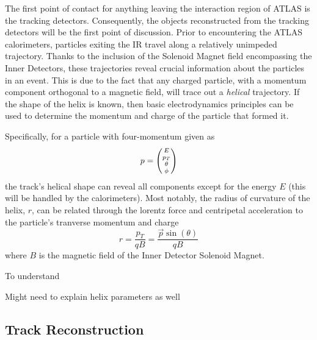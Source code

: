             The first point of contact for anything leaving the interaction region of ATLAS is the tracking detectors.
            Consequently, the objects reconstructed from the tracking detectors will be the first point of discussion.
            Prior to encountering the ATLAS calorimeters, particles exiting the IR travel along a relatively unimpeded trajectory.
            Thanks to the inclusion of the Solenoid Magnet field encompassing the Inner Detectors,
                these trajectories reveal crucial information about the particles in an event.
            This is due to the fact that any charged particle, with a momentum component orthogonal to a magnetic field,
                will trace out a \textit{helical} trajectory.
            If the shape of the helix is known, then basic electrodynamics principles can be used to determine the
                momentum and charge of the particle that formed it.



            Specifically, for a particle with four-momentum given as 
            \begin{equation}
            p = \minimatrix{E \\ p_T \\ \theta \\ \phi}
            \end{equation}
            the track's helical shape can reveal all components except for the energy $E$ (this will be handled by the calorimeters).
            Most notably, the radius of curvature of the helix, $r$, can be related through the lorentz force and centripetal acceleration
                to the particle's tranverse momentum and charge
            \begin{equation}
            r = \frac{p_T}{qB} = \frac{\vec{p} \sin(\theta)}{qB}
            \end{equation}
            where $B$ is the magnetic field of the Inner Detector Solenoid Magnet.

            To understand 
            



            Might need to explain helix parameters as well
            \cite{thesis_track_sim_and_reco}
            \cite{thesis_giacinto}

        \subsection{Track Reconstruction}


